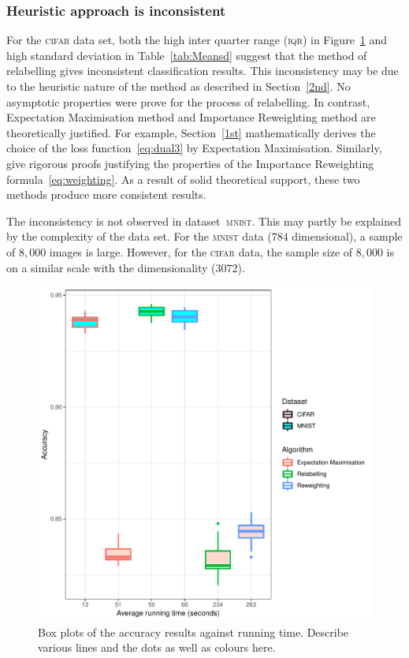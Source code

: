 \documentclass[12pt]{article} %
\begin{document}
\subsubsection{Heuristic approach is inconsistent}
For the \textsc{cifar} data set, both the high inter quarter range (\textsc{iqr}) in Figure~\ref{fig:Boxplot} and high standard deviation in Table~\ref{tab:Meansd} suggest that the method of relabelling gives inconsistent classification results. This inconsistency may be due to the heuristic nature of the method as described in  Section~\ref{2nd}. No asymptotic properties were prove for the process of relabelling. In contrast, Expectation Maximisation method and Importance Reweighting method are theoretically justified. For example, Section~\ref{1st} mathematically derives the choice of the loss function~\eqref{eq:dual3} by Expectation Maximisation.
Similarly, \citet{liu2016classification} give rigorous proofs justifying the properties of the Importance Reweighting formula~\eqref{eq:weighting}. As a result of solid theoretical support, these two methods produce more consistent results.

The inconsistency is not observed in dataset~\textsc{mnist}. This may partly be explained by the complexity of the data set. For the \textsc{mnist} data ($784$ dimensional), a sample of $8,000$ images is large. However, for the \textsc{cifar} data, the sample size of $8,000$ is on a similar scale with the dimensionality ($3072$).
\begin{figure}
	\centering
    \includegraphics[scale=0.7]{boxplot}%
	\caption{Box plots of the accuracy results against running time. {\color{red}Describe various lines and the dots as well as colours here. }
}
	\label{fig:Boxplot}
\end{figure}
\end{document}
